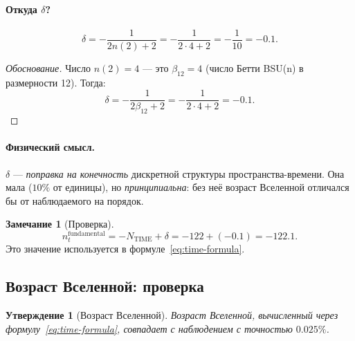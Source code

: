 \documentclass[11pt,a4paper]{article}
\newtheorem{proposition}[theorem]{Утверждение}
\theoremstyle{definition}
\newtheorem{remark}[theorem]{Замечание}
\begin{document}
\paragraph{Откуда $\delta$?}
\begin{equation}
    \boxed{
    \delta = -\frac{1}{2 n(2) + 2} = -\frac{1}{2 \cdot 4 + 2} 
    = -\frac{1}{10} = -0.1.
    }
    \label{eq:delta-formula}
\end{equation}

\begin{proof}[Обоснование]
Число $n(2) = 4$ — это $\beta_{12} = 4$ (число Бетти BSU(n) 
в размерности 12). Тогда:
\begin{equation}
    \delta = -\frac{1}{2 \beta_{12} + 2} = -\frac{1}{2 \cdot 4 + 2} 
    = -0.1.
\end{equation}
\end{proof}

\paragraph{Физический смысл.}
$\delta$ — \emph{поправка на конечность} дискретной структуры 
пространства-времени. Она мала ($10\%$ от единицы), но 
\emph{принципиальна}: без неё возраст Вселенной отличался бы 
от наблюдаемого на порядок.

\begin{remark}[Проверка]
\label{rem:delta-check}
\begin{equation}
    n_t^{\text{fundamental}} = -N_{\text{TIME}} + \delta 
    = -122 + (-0.1) = -122.1.
\end{equation}
Это значение используется в формуле~\eqref{eq:time-formula}.
\end{remark}

\subsection{Возраст Вселенной: проверка}
\label{subsec:time-age}

\begin{proposition}[Возраст Вселенной]
\label{prop:universe-age}
Возраст Вселенной, вычисленный через формулу~\eqref{eq:time-formula}, 
совпадает с наблюдением с точностью $\mathbf{0.025\%}$.
\end{proposition}
\end{document}
